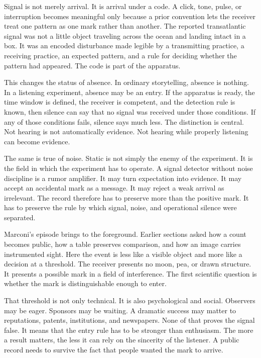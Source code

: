 Signal is not merely arrival. It is arrival under a code. A click, tone, pulse,
or interruption becomes meaningful only because a prior convention lets the
receiver treat one pattern as one mark rather than another. The reported
transatlantic signal was not a little object traveling across the ocean and
landing intact in a box. It was an encoded disturbance made legible by a
transmitting practice, a receiving practice, an expected pattern, and a rule
for deciding whether the pattern had appeared. The code is part of the
apparatus.

This changes the status of absence. In ordinary storytelling, absence is
nothing. In a listening experiment, absence may be an entry. If the apparatus
is ready, the time window is defined, the receiver is competent, and the
detection rule is known, then silence can say that no signal was received under
those conditions. If any of those conditions fails, silence says much less.
The distinction is central. Not hearing is not automatically evidence. Not
hearing while properly listening can become evidence.

The same is true of noise. Static is not simply the enemy of the experiment. It
is the field in which the experiment has to operate. A signal detector without
noise discipline is a rumor amplifier. It may turn expectation into evidence.
It may accept an accidental mark as a message. It may reject a weak arrival as
irrelevant. The record therefore has to preserve more than the positive mark.
It has to preserve the rule by which signal, noise, and operational silence
were separated.

Marconi's episode brings  to the foreground. Earlier
sections asked how a count becomes public, how a table preserves comparison,
and how an image carries instrumented sight. Here the event is less like a
visible object and more like a decision at a threshold. The receiver presents
no moon, pea, or drawn structure. It presents a possible mark in a
field of interference. The first scientific question is whether the mark is
distinguishable enough to enter.

That threshold is not only technical. It is also psychological and social.
Observers may be eager. Sponsors may be waiting. A dramatic success may matter
to reputations, patents, institutions, and newspapers. None of that proves the
signal false. It means that the entry rule has to be stronger than
enthusiasm. The more a result matters, the less it can rely on the
sincerity of the listener. A public record needs to survive the fact that
people wanted the mark to arrive.

